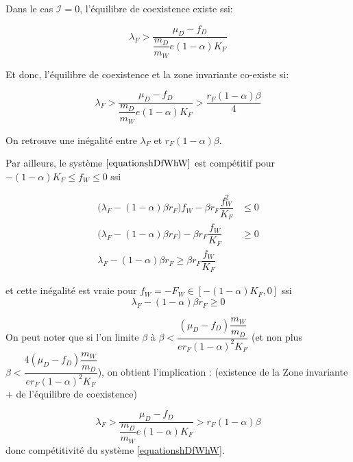 \documentclass{article}
\newcommand{\lfw}{\lambda_{F}}
\newcommand{\lfw}{\lambda_{F}}
\newcommand{\cI}{\mathcal{I}}
\begin{document}
Dans le cas $\cI = 0$, l'équilibre de coexistence existe ssi:

\begin{equation}
\lfw > \dfrac{\mu_D - f_D}{\dfrac{m_D}{m_W} e (1-\alpha)K_F}
\end{equation}

Et donc, l'équilibre de coexistence et la zone invariante co-existe si:

$$
\lfw > \dfrac{\mu_D - f_D}{\dfrac{m_D}{m_W} e (1-\alpha)K_F} > \dfrac{r_F (1-\alpha) \beta}{4}
$$


On retrouve une inégalité entre $\lfw$ et $r_F(1- \alpha) \beta$.


Par ailleurs, le système $\eqref{equationshDfWhW}$ est compétitif pour $-(1-\alpha) K_F \leq f_W \leq 0$ ssi

\begin{align*}
\Big(\lfw - (1-\alpha)\beta r_F \Big) f_W - \beta r_F \dfrac{f_W^2}{K_F} &\leq 0 \\
\Big(\lfw - (1-\alpha)\beta r_F \Big) - \beta r_F \dfrac{f_W}{K_F} &\geq 0 \\
\lfw- (1-\alpha)\beta r_F \geq \beta r_F\dfrac{f_W}{K_F}
\end{align*}

et cette inégalité est vraie pour $f_W = -F_W \in [-(1-\alpha) K_F, 0]$ ssi $$\lfw- (1-\alpha)\beta r_F \geq 0$$


On peut noter que si l'on limite $\beta$ à $\beta < \dfrac{(\mu_D - f_D) \dfrac{m_W}{m_D}} {er_F (1-\alpha)^2K_F}$ (et non plus $\beta < \dfrac{4(\mu_D - f_D) \dfrac{m_W}{m_D}} {er_F (1-\alpha)^2 K_F}$), on obtient l'implication : (existence de la Zone invariante + de l'équilibre de coexistence)

$$
\lfw > \dfrac{\mu_D - f_D}{\dfrac{m_D}{m_W} e (1-\alpha)K_F} > r_F (1-\alpha) \beta
$$
donc compétitivité du système \eqref{equationshDfWhW}.
\end{document}
